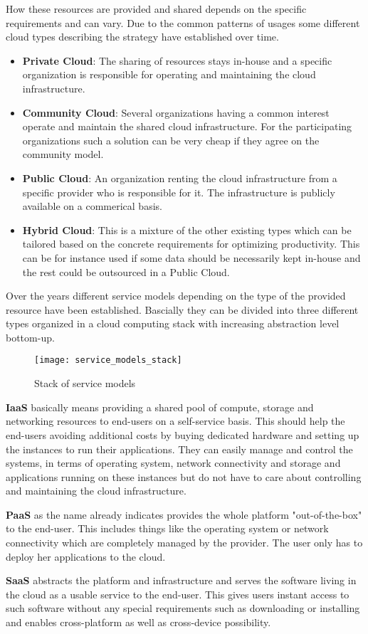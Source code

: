 How these resources are provided and shared depends on the specific requirements and can vary. Due to the common patterns of usages some different cloud types describing the strategy have established over time. \cite{Dialogic_Corporation}
\begin{itemize}
	\item \textbf{Private Cloud}: The sharing of resources stays in-house and a specific organization is responsible for operating and maintaining the cloud infrastructure.
	\item \textbf{Community Cloud}: Several organizations having a common interest operate and maintain the shared cloud infrastructure. For the participating organizations such a solution can be very cheap if they agree on the community model.
	\item \textbf{Public Cloud}: An organization renting the cloud infrastructure from a specific provider who is responsible for it. The infrastructure is publicly available on a commerical basis. 
	\item \textbf{Hybrid Cloud}: This is a mixture of the other existing types which can be tailored based on the concrete requirements for optimizing productivity. This can be for instance used if some data should be necessarily kept in-house and the rest could be outsourced in a Public Cloud.
	\end{itemize} 

Over the years different service models depending on the type of the provided resource have been established. 
Bascially they can be divided into three different types organized in a cloud computing stack with increasing abstraction level bottom-up.

\begin{figure}[h!]
	\centering
		\texttt{[image: service\_models\_stack]}
	\caption{Stack of service models}
\end{figure}

\textbf{IaaS} basically means providing a shared pool of compute, storage and networking resources to end-users on a self-service basis. \cite{Oracle} This should help the end-users avoiding additional costs by buying dedicated hardware and setting up the instances to run their applications. They can easily manage and control the systems, in terms of operating system, network connectivity and storage and applications running on these instances but do not have to care about controlling and maintaining the cloud infrastructure. \cite{Dialogic_Corporation}

\textbf{PaaS} as the name already indicates provides the whole platform "out-of-the-box" to the end-user. This includes things like the operating system or network connectivity which are completely managed by the provider. The user only has to deploy her applications to the cloud. \cite{Dialogic_Corporation}

\textbf{SaaS} abstracts the platform and infrastructure and serves the software living in the cloud as a usable service to the end-user. \cite {Dialogic_Corporation}  This gives users instant access to such software without any special requirements such as downloading or installing and enables cross-platform as well as cross-device possibility. 